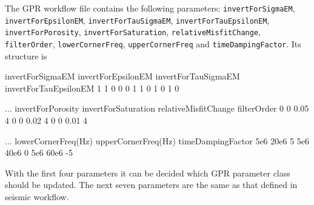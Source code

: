 \documentclass[pdftex,a4paper,parskip,listof=totoc,bibliography=totoc,onehalfspacing,12pt]{scrreprt}
\begin{document}
The GPR workflow file contains the following parameters: \verb+invertForSigmaEM+, \verb+invertForEpsilonEM+, \verb+invertForTauSigmaEM+, \verb+invertForTauEpsilonEM+, \verb+invertForPorosity+, \verb+invertForSaturation+, \verb+relativeMisfitChange+, \verb+filterOrder+, \verb+lowerCornerFreq+, \verb+upperCornerFreq+ and \verb+timeDampingFactor+. Its structure is 
\begin{verbnobox}[\fontsize{11pt}{11pt}\selectfont]
invertForSigmaEM invertForEpsilonEM invertForTauSigmaEM invertForTauEpsilonEM
      1                1                  0                   0                 
      0                1                  1                   0                 
      1                0                  1                   0                 
\end{verbnobox}
\begin{verbnobox}[\fontsize{11pt}{11pt}\selectfont]
... invertForPorosity invertForSaturation relativeMisfitChange filterOrder 
          0                 0                      0.05            4
          0                 0                      0.02            4
          0                 0                      0.01            4
\end{verbnobox}
\begin{verbnobox}[\fontsize{11pt}{11pt}\selectfont]
... lowerCornerFreq(Hz) upperCornerFreq(Hz) timeDampingFactor
         5e6                 20e6                5  
         5e6                 40e6                0
         5e6                 60e6               -5
\end{verbnobox}
With the first four parameters it can be decided which GPR parameter class should be updated. The next seven parameters are the same as that defined in seismic workflow.
\end{document}
